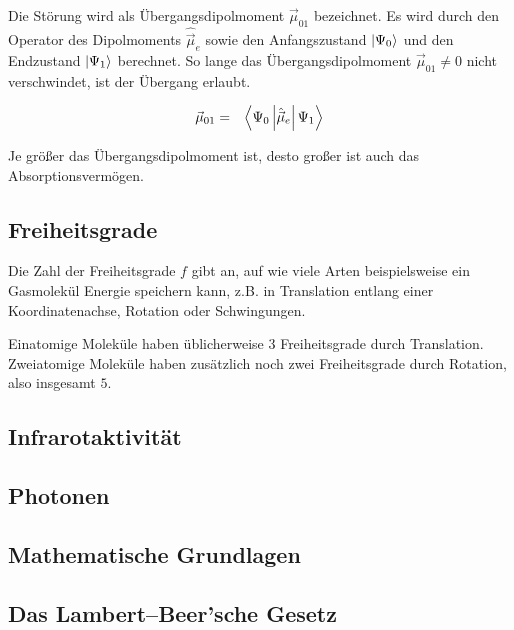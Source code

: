 \documentclass[12pt,a4paper]{scrartcl}
\numberwithin{equation}{section} %
\renewcommand{\[}{} %
\renewcommand{\]}{\noindent} %
\begin{document}
Die Störung wird als Übergangsdipolmoment \(\vec\mu_{01}\) bezeichnet. Es wird durch den Operator des Dipolmoments \(\hat {\vec \mu}_e\) sowie den Anfangszustand \(\ket{\Psi_0}\) und den Endzustand \(\ket{\Psi_1}\) berechnet. So lange das Übergangsdipolmoment \(\vec\mu_{01}\neq0\) nicht verschwindet, ist der Übergang erlaubt.

\[
\begin{eqnarray}
    \vec \mu_{01} &=& \expval{\Psi_0\left|\hat {\vec \mu}_e\right|\Psi_1}
\end{eqnarray}
\]

\noindent
Je größer das Übergangsdipolmoment ist, desto großer ist auch das Absorptionsvermögen.

\hypertarget{freiheitsgrade}{%
\subsection{Freiheitsgrade}\label{freiheitsgrade}}

Die Zahl der Freiheitsgrade \(f\) gibt an, auf wie viele Arten beispielsweise ein Gasmolekül Energie speichern kann, z.B. in Translation entlang einer Koordinatenachse, Rotation oder Schwingungen.

Einatomige Moleküle haben üblicherweise \(3\) Freiheitsgrade durch Translation. Zweiatomige Moleküle haben zusätzlich noch zwei Freiheitsgrade durch Rotation, also insgesamt \(5\).

\hypertarget{infrarotaktivituxe4t}{%
\subsection{Infrarotaktivität}\label{infrarotaktivituxe4t}}

\hypertarget{photonen}{%
\subsection{Photonen}\label{photonen}}

\hypertarget{mathematische-grundlagen}{%
\subsection{Mathematische Grundlagen}\label{mathematische-grundlagen}}

\hypertarget{das-lambertbeersche-gesetz}{%
\subsection{Das Lambert--Beer'sche
Gesetz}\label{das-lambertbeersche-gesetz}}
\end{document}
